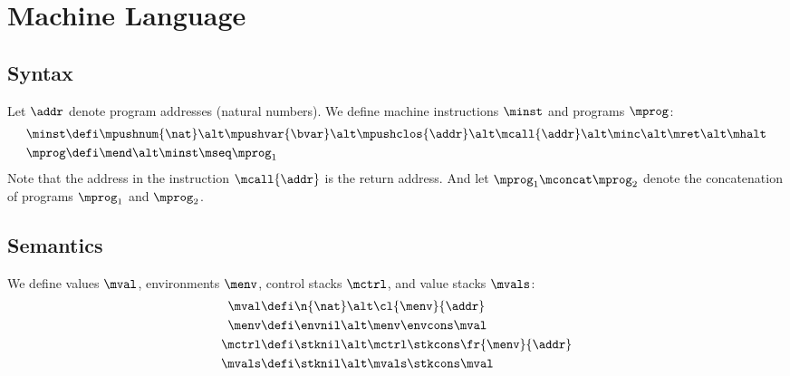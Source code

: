 \section*{Machine Language}



\subsection*{Syntax}

Let $\addr$ denote program addresses (natural numbers).
We define machine instructions $\minst$ and programs $\mprog$:
\begin{align*}
  \minst &\defi \mpushnum{\nat} \alt \mpushvar{\bvar} \alt \mpushclos{\addr} \alt \mcall{\addr} \alt \minc \alt \mret \alt \mhalt \\
  \mprog &\defi \mend \alt \minst \mseq \mprog_1
\end{align*}
Note that the address in the instruction $\mcall{\addr}$ is the return address.
And let $\mprog_1 \mconcat \mprog_2$ denote the concatenation of programs $\mprog_1$ and $\mprog_2$.


\subsection*{Semantics}

We define values $\mval$, environments $\menv$, control stacks $\mctrl$, and value stacks $\mvals$:
\begin{align*}
  \mval &\defi \n{\nat} \alt \cl{\menv}{\addr} \\
  \menv &\defi \envnil \alt \menv \envcons \mval \\
  \mctrl &\defi \stknil \alt \mctrl \stkcons \fr{\menv}{\addr} \\
  \mvals &\defi \stknil \alt \mvals \stkcons \mval
\end{align*}

